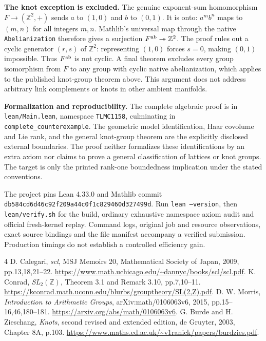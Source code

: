 \documentclass[10pt,a4paper]{article}
\begin{document}
\textbf{The knot exception is excluded.}
The genuine exponent-sum homomorphism
$F\to(\mathbb Z^2,+)$ sends $a$ to $(1,0)$ and $b$ to $(0,1)$.
It is onto: $a^m b^n$ maps to $(m,n)$ for all integers $m,n$.
Mathlib's universal map through the native \texttt{Abelianization}
therefore gives a surjection $F^{\rm ab}\twoheadrightarrow\mathbb Z^2$.
The proof rules out a cyclic generator $(r,s)$ of $\mathbb Z^2$:
representing $(1,0)$ forces $s=0$, making $(0,1)$ impossible.
Thus $F^{\rm ab}$ is not cyclic. A final theorem excludes every group
isomorphism from $F$ to any group with cyclic native abelianization,
which applies to the published knot-group theorem above. This argument
does not address arbitrary link complements or knots in other ambient
manifolds.

\textbf{Formalization and reproducibility.}
The complete algebraic proof is in \texttt{lean/Main.lean}, namespace
\texttt{TLMC1158}, culminating in \texttt{complete\_counterexample}.
The geometric model identification, Haar covolume and Lie rank, and the
general knot-group theorem are the explicitly disclosed external
boundaries. The proof neither formalizes these identifications by an
extra axiom nor claims to prove a general classification of lattices or
knot groups. The target is only the printed rank-one boundedness
implication under the stated conventions.

The project pins Lean 4.33.0 and Mathlib commit
\texttt{db584cd6d46c92f209a44c0f1c829460d327499d}.
Run \texttt{lean --version}, then \texttt{lean/verify.sh} for the build,
ordinary exhaustive namespace axiom audit and official fresh-kernel
replay. Command logs, original job and resource observations, exact
source bindings and the file manifest accompany a verified submission.
Production timings do not establish a controlled efficiency gain.

\small
\begin{thebibliography}{4}
 D. Calegari, \emph{scl}, MSJ Memoirs 20, Mathematical
Society of Japan, 2009, pp.13,18,21--22.
\url{https://www.math.uchicago.edu/~dannyc/books/scl/scl.pdf}.
 K. Conrad, \emph{SL$_2(\mathbb Z)$}, Theorem 3.1 and
Remark 3.10, pp.7,10--11.
\url{https://kconrad.math.uconn.edu/blurbs/grouptheory/SL(2,Z).pdf}.
 D. W. Morris, \emph{Introduction to Arithmetic Groups},
arXiv:math/0106063v6, 2015, pp.15--16,46,180--181.
\url{https://arxiv.org/abs/math/0106063v6}.
 G. Burde and H. Zieschang, \emph{Knots}, second revised
and extended edition, de Gruyter, 2003, Chapter 8A, p.103.
\url{https://www.maths.ed.ac.uk/~v1ranick/papers/burdzies.pdf}.
\end{thebibliography}
\end{document}
